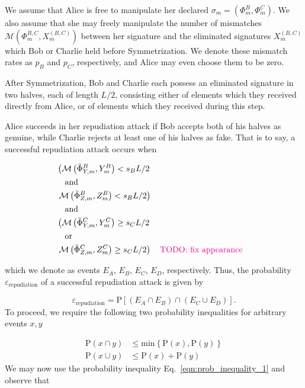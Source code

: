 We assume that Alice is free to manipulate her declared $\sigma_m = \left(\Phi_m^B, \Phi_m^C\right)$. We also assume that she may freely manipulate the number of mismatches $\mathcal{M}\left(\Phi_m^{B, C}, X_m^{\left(B, C\right)}\right)$ between her signature and the eliminated signatures $X_m^{\left(B, C\right)}$ which Bob or Charlie held before Symmetrization. We denote these mismatch rates as $p_B$ and $p_C$, respectively, and Alice may even choose them to be zero.

After Symmetrization, Bob and Charlie each possess an eliminated signature in two halves, each of length $L/2$, consisting either of elements which they received directly from Alice, or of elements which they received during this step. 

Alice succeeds in her repudiation attack if Bob accepts both of his halves as genuine, while Charlie rejects at least one of his halves as fake. That is to say, a successful repudiation attack occurs when

\begin{align}\label{eqn:repudiation_events}
&\left(\mathcal{M}\left(\tilde{\Phi}_{Y, m}^B, Y_m^B\right) < s_B L/2 \right. \notag\\
&\qq{and} \notag \\
&\left.\mathcal{M}\left(\tilde{\Phi}_{Z, m}^B, Z_m^B\right) < s_B L/2 \right) \notag \\
&\qq{and} \notag \\
&\left(\mathcal{M}\left(\tilde{\Phi}_{Y, m}^C, Y_m^C\right) \ge s_C L/2 \right. \notag \\
&\qq{or} \notag \\
&\left.\mathcal{M}\left(\tilde{\Phi}_{Z, m}^C, Z_m^C\right) \ge s_C L/2 \right) \qq{\MT{TODO: fix appearance}}
\end{align}

\noindent which we denote as events $E_A$, $E_B$, $E_C$, $E_D$, respectively. 
Thus, the probability $\varepsilon_{\text{repudiation}}$ of a successful repudiation attack is given by

\begin{equation}
\varepsilon_{\text{repudiation}} = \text{P}\left[\left(E_A \cap E_B\right) \cap \left(E_C \cup E_D\right)\right].
\end{equation}
To proceed, we require the following two probability inequalities for arbitrary events $x, y$

\begin{align}
\label{eqn:prob_inequality_1}
\text{P}\left(x \cap y\right) &\le \text{min}\left\{\text{P}\left(x\right), \text{P}\left(y\right)\right\} \\
\label{eqn:prob_inequality_2}
\text{P}\left(x \cup y\right) &\le \text{P}\left(x\right) + \text{P}\left(y\right)
\end{align}
\noindent We may now use the probability inequality Eq.~\ref{eqn:prob_inequality_1} and observe that 

